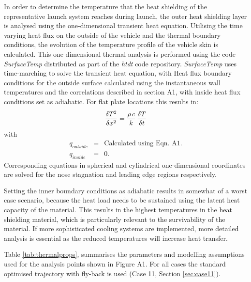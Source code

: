 In order to determine the temperature that the heat shielding of the representative launch system reaches during launch, the outer heat shielding layer is analysed using the one-dimensional transient heat equation. Utilising the time varying heat flux on the outside of the vehicle and the thermal boundary conditions, the evolution of the temperature profile of the vehicle skin is calculated. 
This one-dimensional thermal analysis is performed using the code {\it SurfaceTemp} distributed as part of the {\it htdt} code repository\cite{XXX}. {\it SurfaceTemp} uses time-marching to solve the transient heat equation, with Heat flux boundary conditions for the outside surface calculated using the instantaneous wall temperatures and the correlations described in section A1, with inside heat flux conditions set as adiabatic. For flat plate locations this results in:  
\begin{equation}
\frac{\delta T^2}{\delta x^2} = \frac{\rho \, c}{k} \, \frac{\delta T}{\delta t} \\
\end{equation}
with
\begin{eqnarray}
q_{outside} &=& \text{Calculated using Eqn. A1.} \\
q_{inside} &=& 0. 
\end{eqnarray}
Corresponding equations in spherical and cylindrical one-dimensional coordinates are solved for the nose stagnation and leading edge regions respectively. 

Setting the inner boundary conditions as adiabatic results in somewhat of a worst case scenario, because the heat load needs to be sustained using the latent heat capacity of the material. This results in the highest temperatures in the heat shielding material, which is particularly relevant to the survivability of the material. If more sophisticated cooling systems are implemented, more detailed analysis is essential as the reduced temperatures will increase heat transfer. 

Table \ref{tab:thermalprops}, summarises the parameters and modelling assumptions used for the analysis points shown in Figure A1. For all cases the standard optimised trajectory with fly-back is used (Case 11, Section \ref{sec:case11}). 

